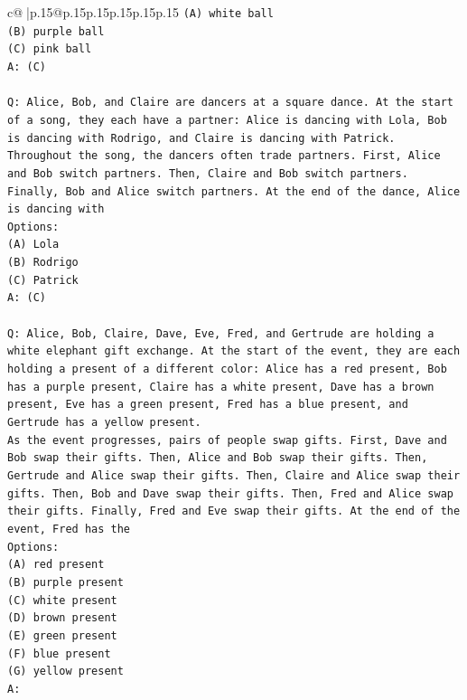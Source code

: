 \documentclass{article}
\begin{document}
{\begin{supertabular}{c@{$\;$}|p{.15\linewidth}@{}p{.15\linewidth}p{.15\linewidth}p{.15\linewidth}p{.15\linewidth}p{.15\linewidth}}
{{{\texttt{(A) white ball} \\
\texttt{(B) purple ball} \\
\texttt{(C) pink ball} \\
\texttt{A: (C)} \\
\\ 
\texttt{Q: Alice, Bob, and Claire are dancers at a square dance. At the start of a song, they each have a partner: Alice is dancing with Lola, Bob is dancing with Rodrigo, and Claire is dancing with Patrick.} \\
\texttt{Throughout the song, the dancers often trade partners. First, Alice and Bob switch partners. Then, Claire and Bob switch partners. Finally, Bob and Alice switch partners. At the end of the dance, Alice is dancing with} \\
\texttt{Options:} \\
\texttt{(A) Lola} \\
\texttt{(B) Rodrigo} \\
\texttt{(C) Patrick} \\
\texttt{A: (C)} \\
\\ 
\texttt{Q: Alice, Bob, Claire, Dave, Eve, Fred, and Gertrude are holding a white elephant gift exchange. At the start of the event, they are each holding a present of a different color: Alice has a red present, Bob has a purple present, Claire has a white present, Dave has a brown present, Eve has a green present, Fred has a blue present, and Gertrude has a yellow present.} \\
\texttt{As the event progresses, pairs of people swap gifts. First, Dave and Bob swap their gifts. Then, Alice and Bob swap their gifts. Then, Gertrude and Alice swap their gifts. Then, Claire and Alice swap their gifts. Then, Bob and Dave swap their gifts. Then, Fred and Alice swap their gifts. Finally, Fred and Eve swap their gifts. At the end of the event, Fred has the} \\
\texttt{Options:} \\
\texttt{(A) red present} \\
\texttt{(B) purple present} \\
\texttt{(C) white present} \\
\texttt{(D) brown present} \\
\texttt{(E) green present} \\
\texttt{(F) blue present} \\
\texttt{(G) yellow present} \\
\texttt{A:} \\
            }
        }
    }
     \\ \\


\end{supertabular}}
\end{document}
